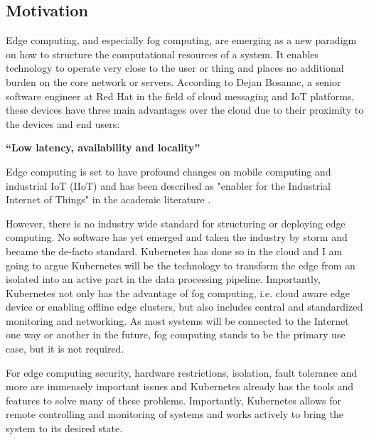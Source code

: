 \subsection{Motivation}
Edge computing, and especially fog computing, are emerging as a new paradigm on how to structure the computational resources of a system. It enables technology to operate very close to the user or thing and places no additional burden on the core network or servers. According to Dejan Bosanac, a senior software engineer at Red Hat in the field of cloud messaging and IoT platforms, these devices have three main advantages over the cloud due to their proximity to the devices and end users: 
\begin{displayquote}
{\textbf{``Low latency, availability and locality''}}\cite{IntroducingDejanBosanac:KubernetesIoTEdgeWorkingGroup}
\end{displayquote} 
Edge computing is set to have profound changes on mobile computing and industrial IoT (IIoT) and has been described as "enabler for the Industrial Internet of Things"\cite{steiner2016fogenablerIIoT} in the academic literature .

However, there is no industry wide standard for structuring or deploying edge computing. No software has yet emerged and taken the industry by storm and became the de-facto standard. Kubernetes has done so in the cloud and I am going to argue Kubernetes will be the technology to transform the edge from an isolated into an active part in the data processing pipeline. Importantly, Kubernetes not only has the advantage of fog computing, i.e. cloud aware edge device or enabling offline edge clusters, but also includes central and standardized monitoring and networking. As most systems will be connected to the Internet one way or another in the future, fog computing stands to be the primary use case, but it is not required.

For edge computing security, hardware restrictions, isolation, fault tolerance and more are immensely important issues and Kubernetes already has the tools and features to solve many of these problems. Importantly, Kubernetes allows for remote controlling and monitoring of systems and works actively to bring the system to its desired state.\\

